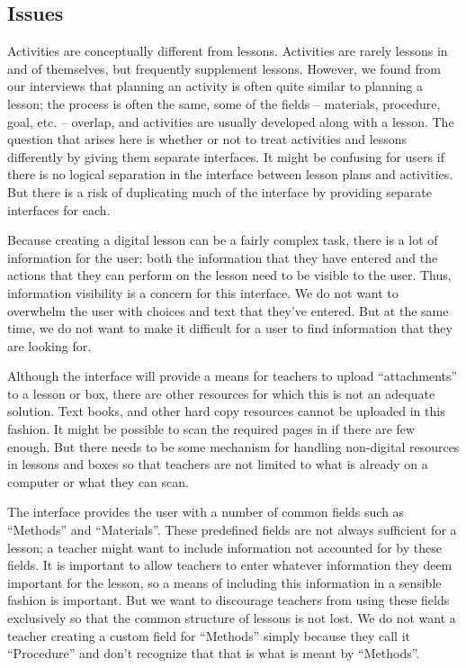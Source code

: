 \documentclass[10pt,letter]{article}
\begin{document}
\subsection{Issues}
\label{sec: issues}
Activities are conceptually different from lessons. Activities are rarely
lessons in and of themselves, but frequently supplement lessons. However,
we found from our interviews that planning an activity is often quite similar to
planning a lesson; the process is often the same, some of the fields --
materials, procedure, goal, etc. -- overlap, and activities are usually
developed along with a lesson. The question that arises here is whether or not
to treat activities and lessons differently by giving them separate interfaces.
It might be confusing for users if there is no logical separation in the
interface between lesson plans and activities. But there is a risk of
duplicating much of the interface by providing separate interfaces for each.

Because creating a digital lesson can be a fairly complex task, there is a lot
of information for the user: both the information that they have entered and the
actions that they can perform on the lesson need to be visible to the user.
Thus, information visibility is a concern for this interface. We do not want to
overwhelm the user with choices and text that they've entered. But at the same
time, we do not want to make it difficult for a user to find information that
they are looking for.

Although the interface will provide a means for teachers to upload
``attachments'' to a lesson or box, there are other resources for which this is
not an adequate solution. Text books, and other hard copy resources cannot be
uploaded in this fashion. It might be possible to scan the required pages in if
there are few enough. But there needs to be some mechanism for handling
non-digital resources in lessons and boxes so that teachers are not limited to
what is already on a computer or what they can scan.

The interface provides the user with a number of common fields such as
``Methods'' and ``Materials''. These predefined fields are not always sufficient
for a lesson; a teacher might want to include information not accounted for by
these fields. It is important to allow teachers to enter whatever information
they deem important for the lesson, so a means of including this information in
a sensible fashion is important.  But we want to discourage teachers from using
these fields exclusively so that the common structure of lessons is not lost. We
do not want a teacher creating a custom field for ``Methods'' simply because
they call it ``Procedure'' and don't recognize that that is what is meant by
``Methods''.
\end{document}
